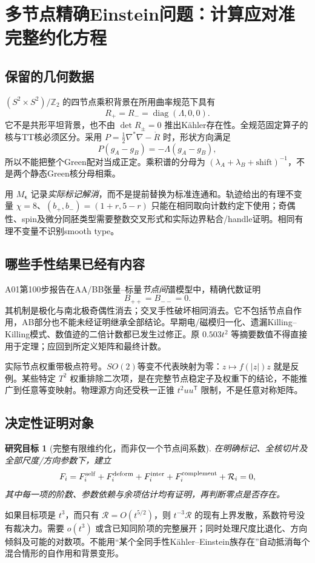\documentclass[UTF8,a4paper,11pt,fontset=fandol]{ctexart}
\numberwithin{equation}{section}
\newtheorem{target}[theorem]{研究目标}
\theoremstyle{definition}
\newcommand{\Z}{\mathbb Z}
\begin{document}
\section{多节点精确Einstein问题：计算应对准完整约化方程}
\subsection{保留的几何数据}
$(S^2\times S^2)/\Z_2$ 的四节点乘积背景在所用曲率规范下具有
\[
R_+=R_-=\operatorname{diag}(\Lambda,0,0).
\]
它不是共形平坦背景，也不由 $\det R_\pm=0$ 推出K\"ahler存在性。全规范固定算子的核与TT核必须区分。采用 $P=\frac12\nabla^*\nabla-\mathring R$ 时，形状方向满足
\[
P(g_A-g_B)=-\Lambda(g_A-g_B),
\]
所以不能把整个Green配对当成正定。乘积谱的分母为 $(\lambda_A+\lambda_B+\text{shift})^{-1}$，不是两个静态Green核分母相乘。

用 $M_{\boldsymbol\epsilon}$ 记录\emph{实际标记解消}，而不是提前替换为标准连通和。轨迹给出的有理不变量 $\chi=8$、$(b_+,b_-)=(1+r,5-r)$ 只能在相同取向计数约定下使用；奇偶性、spin及微分同胚类型需要整数交叉形式和实际边界粘合/handle证明。相同有理不变量不识别smooth type。

\subsection{哪些手性结果已经有内容}
A01第100步报告在AA/BB张量--标量\emph{节点间}谱模型中，精确代数证明
\[
B_{++}=B_{--}=0.
\]
其机制是极化与南北极奇偶性消去；交叉手性破坏相同消去。它不包括节点自作用，AB部分也不能未经证明继承全部结论。早期电/磁模归一化、遗漏Killing--Killing模式、数值迹的二倍计数都已发生过修正。原 $0.503t^2$ 等摘要数值不得直接用于定理；应回到所定义矩阵和最终计数。

实际节点权重带极点符号。$SO(2)$等变不代表映射为零：$z\mapsto f(|z|)z$ 就是反例。某些特定 $T^2$ 权重排除二次项，是在完整节点稳定子及权重下的结论，不能推广到任意等变映射。物理源方向还受秩一正锥 $t^2uu^{\mathsf T}$ 限制，不是任意对称矩阵。

\subsection{决定性证明对象}
\begin{target}[完整有限维约化，而非仅一个节点间系数]
在明确标记、全核切片及全部尺度/方向参数下，建立
\begin{equation}\label{eq:LS}
F_i=F_i^{\rm self}+F_i^{\rm deform}+F_i^{\rm inter}
+F_i^{\rm complement}+\mathcal R_i=0,
\end{equation}
其中每一项的阶数、参数依赖与余项估计均有证明，再判断零点是否存在。
\end{target}
如果目标项是 $t^3$，而只有 $\mathcal R=O(t^{5/2})$，则 $t^{-3}\mathcal R$ 的现有上界发散，系数符号没有裁决力。需要 $o(t^3)$ 或含已知同阶项的完整展开；同时处理尺度比退化、方向倾斜及可能的对数项。不能用“某个全同手性K\"ahler--Einstein族存在”自动抵消每个混合情形的自作用和背景变形。
\end{document}
